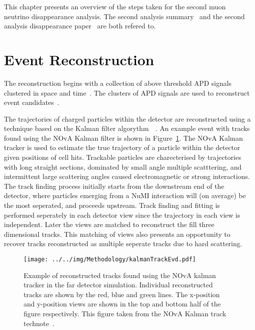 This chapter presents an overview of the steps taken for the second
muon neutrino disappearance analysis. 
The second analysis summary~\cite{SASummary} and the second analysis
disappearance paper~\cite{NOvASA} are both refered to.



\section{Event Reconstruction}\label{sec:reco}

The reconstruction begins with a collection of above threshold APD
signals clustered in space and time~\cite{baird2015analysis,
  ester1996density}. 
The clusters of APD signals are used to reconstruct event
candidates~\cite{baird2015analysis}.

The trajectories of charged particles within the detector are
reconstructed using a technique based on the Kalman filter
algorythm~\cite{kalman1960new}~\cite{KalmanTrackNote}. An example
event with tracks found using the NOvA Kalman filter is shown in
Figure~\ref{fig:recoTrackEvd}. 
The NOvA Kalman tracker is used to estimate the true trajectory of a
particle within the detector given positions of cell
hits. Trackable particles are charecterised by trajectories with long
straight sections, dominated by small angle multiple scatttering, and
intermittent large scattering angles caused electromagnetic or
strong interactions. 
The track finding process initially starts from the downstream end of
the detector, where particles emerging from a NuMI interaction will
(on average) be the most seperated, and proceeds upstream. 
Track finding and fitting is performed seperately in each detector
view since the trajectory in each view is independent. Later the views
are matched to reconstruct the fill three dimensional tracks. This
matching of views also presents an opportunity to recover tracks
reconstructed as multiple seperate tracks due to hard
scattering.
~\cite{KalmanTrackNote}  

\begin{figure}
  \centering
  \texttt{[image: ../../img/Methodology/kalmanTrackEvd.pdf]} 
  \caption{Example of reconstructed tracks found using the NOvA kalman
    tracker in the far detector simulation. Individual reconstructed
    tracks are shown by the red, blue and green lines. The x-position
    and y-position views are shown in the top and bottom half of the
    figure respectively. This figure taken from the NOvA Kalman track
    technote~\cite{KalmanTrackNote}.   
  } 
  \label{fig:recoTrackEvd}
\end{figure}


